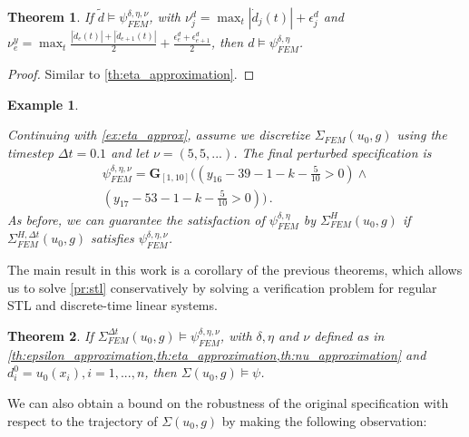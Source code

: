 \documentclass[letterpaper, 10 pt, conference]{ieeeconf/ieeeconf}
\newtheorem{theorem}{Theorem}
\newtheorem{example}{Example}
\newcommand{\Always}{\mathbf{G}}
\begin{document}
\begin{theorem}
    \label{th:nu_approximation}
    If $\tilde d \models \psi^{\delta, \eta, \nu}_{FEM}$, with
    $\nu^d_j = \max_t |\dot d_j(t)| + \epsilon^d_j$ and
    $\nu^y_e = \max_t \frac{|\dot d_e(t)| + |\dot d_{e+1}(t)|}{2} +
    \frac{\epsilon^d_e + \epsilon^d_{e+1}}{2}$, then 
    $d \models \psi^{\delta, \eta}_{FEM}$.
\end{theorem}
\begin{proof}
    Similar to \cref{th:eta_approximation}.
\end{proof}

\begin{example}
    \label{ex:nu_approx}

    Continuing with \cref{ex:eta_approx}, assume we discretize $\Sigma_{FEM}(u_0, g)$ using
    the timestep $\Delta t = 0.1$ and let $\nu = (5, 5, ...)$. The final
    perturbed specification is
    \begin{multline}
        \psi^{\delta, \eta, \nu}_{FEM} = \Always_{[1,10]} \bigl(
            (y_{16} - 39 - 1 - k - \frac{5}{10} > 0) \land \\ 
            (y_{17} - 53 - 1 - k - \frac{5}{10} > 0)
        \bigr) \,.
    \end{multline}
    As before, we can guarantee the satisfaction of $\psi^{\delta,
    \eta}_{FEM}$ by $\Sigma^H_{FEM}(u_0, g)$ if $\Sigma_{FEM}^{H, \Delta t}(u_0, g)$ satisfies
    $\psi^{\delta, \eta, \nu}_{FEM}$.
    
\end{example}

The main result in this work is a corollary of the previous theorems, which
allows us to solve \cref{pr:stl}
conservatively by solving a verification problem for regular STL and discrete-time
linear systems. 

\begin{theorem}
    \label{th:main}
    If $\Sigma_{FEM}^{\Delta t}(u_0, g) \models \psi^{\delta, \eta, \nu}_{FEM}$, with $\delta, \eta$
    and $\nu$ defined as in \cref{th:epsilon_approximation,th:eta_approximation,th:nu_approximation}
    and $d^0_i = u_0(x_i), i = 1,...,n$, then $\Sigma(u_0, g) \models \psi$.
\end{theorem}

We can also obtain a bound on the robustness of the
original specification with respect to the trajectory of $\Sigma(u_0, g)$ by making the
following observation:
\end{document}
